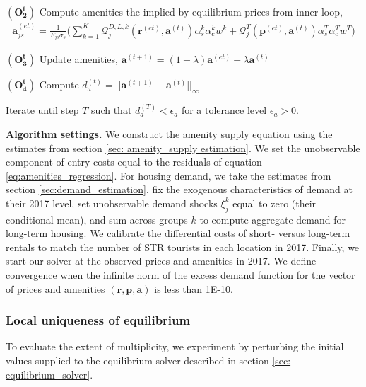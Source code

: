 \documentclass[11pt]{article}
\newcommand{\Paragraph}{\vspace{0.1cm}\noindent\textbf}
\begin{document}
\noindent $\mathbf{(O_2^t)}$ Compute amenities the implied by equilibrium prices from inner loop,
\begin{align*}
    \mathbf{a}_{js}^{(et)} = \frac{1}{F_{js} \sigma_s} \Bigg( \sum_{k=1}^K \mathcal{Q}_j^{D,L,k}(\mathbf{r}^{(et)},\mathbf{a}^{(t)}) \alpha_{s}^k \alpha_c^k w^k +  \mathcal{Q}_j^{T}(\mathbf{p}^{(et)},\mathbf{a}^{(t)}) \alpha_{s}^T \alpha_c^T w^T  \Bigg)
\end{align*}

\noindent $\mathbf{(O_3^t)}$ Update amenities,     $\mathbf{a}^{(t+1)} = (1-\lambda) \mathbf{a}^{(et)} + \lambda \mathbf{a}^{(t)}$

\noindent $\mathbf{(O_4^t)}$ Compute $d_a^{(t)} = ||\mathbf{a}^{(t+1)} - \mathbf{a}^{(t)}||_{\infty}$

\noindent Iterate until step $T$ such that $d_a^{(T)} < \epsilon_a$ for a tolerance level $\epsilon_a > 0$.


\Paragraph{Algorithm settings.}\label{sec:appendix model fit assumptions}
We construct the amenity supply equation using the estimates from section \ref{sec: amenity_supply estimation}. We set the unobservable component of entry costs equal to the residuals of equation \eqref{eq:amenities_regression}. For housing demand, we take the estimates from section \ref{sec:demand_estimation}, fix the exogenous characteristics of demand at their 2017 level, set unobservable demand shocks $\xi^k_{j}$ equal to zero (their conditional mean), and sum across groups $k$ to compute aggregate demand for long-term housing. We calibrate the differential costs of short- versus long-term rentals to match the number of STR tourists in each location in 2017. Finally, we start our solver at the observed prices and amenities in 2017. We define convergence when the infinite norm of the excess demand function for the vector of prices and amenities $(\mathbf{r},\mathbf{p},\mathbf{a})$ is less than 1E-10.

\subsubsection{Local uniqueness of equilibrium}\label{sec:uniqueness} To evaluate the extent of multiplicity, we experiment by perturbing the initial values supplied to the equilibrium solver described in section \ref{sec: equilibrium_solver}. 
\end{document}
